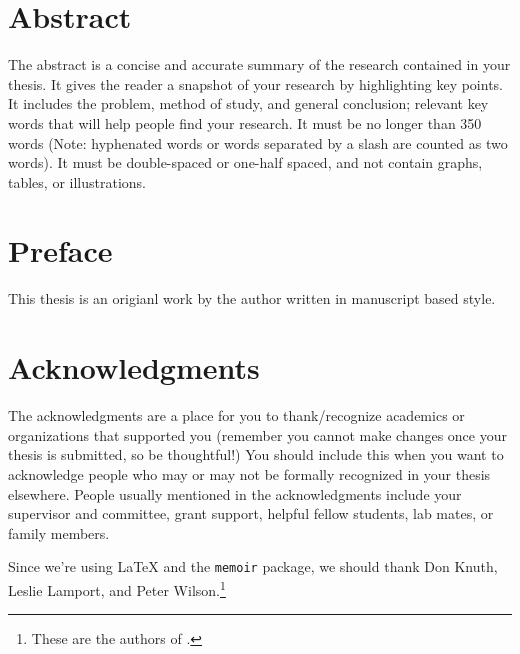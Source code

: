 
\chapter{Abstract}

The abstract is a concise and accurate summary of the research
contained in your thesis. It gives the reader a snapshot of your
research by highlighting key points. It includes the problem, method of
study, and general conclusion; relevant key words that will help
people find your research. It must be no longer than 350 words (Note:
hyphenated words or words separated by a slash are counted as two
words). It must be double-spaced or one-half spaced, and not contain
graphs, tables, or illustrations.

\chapter{Preface}

This thesis is an origianl work by the author written in manuscript based style. 
  
\chapter{Acknowledgments}

The acknowledgments are a place for you to thank/recognize academics
or organizations that supported you (remember you cannot make changes
once your thesis is submitted, so be thoughtful!)  You should include
this when you want to acknowledge people who may or may not be
formally recognized in your thesis elsewhere.  People usually
mentioned in the acknowledgments include your supervisor and
committee, grant support, helpful fellow students, lab mates, or
family members.

Since we're using \LaTeX{} and the \verb|memoir| package, we should
thank Don Knuth, Leslie Lamport, and Peter Wilson.\footnote{These are
the authors of \citet{Knuth1986,Lamport1986,Wilson2016}.}

\dedication{To no one. }

\tableofcontents


\listoftables


\listoffigures

